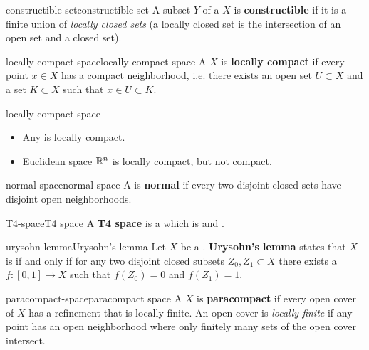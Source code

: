 \begin{topic}{constructible-set}{constructible set}
    A subset $Y$ of a  $X$ is \textbf{constructible} if it is a finite union of \textit{locally closed sets} (a locally closed set is the intersection of an open set and a closed set).
\end{topic}

\begin{topic}{locally-compact-space}{locally compact space}
    A  $X$ is \textbf{locally compact} if every point $x \in X$ has a compact neighborhood, i.e. there exists an open set $U \subset X$ and a  set $K \subset X$ such that $x \in U \subset K$.
\end{topic}

\begin{example}{locally-compact-space}
    \begin{itemize}
        \item Any  is locally compact.
        \item Euclidean space $\mathbb{R}^n$ is locally compact, but not compact.
    \end{itemize}
\end{example}

\begin{topic}{normal-space}{normal space}
    A  is \textbf{normal} if every two disjoint closed sets have disjoint open neighborhoods.
\end{topic}

\begin{topic}{T4-space}{T4 space}
    A \textbf{T4 space} is a  which is  and .
\end{topic}

\begin{topic}{urysohn-lemma}{Urysohn's lemma}
    Let $X$ be a . \textbf{Urysohn's lemma} states that $X$ is  if and only if for any two disjoint closed subsets $Z_0, Z_1 \subset X$ there exists a  $f : [0, 1] \to X$ such that $f(Z_0) = 0$ and $f(Z_1) = 1$.
\end{topic}

\begin{topic}{paracompact-space}{paracompact space}
    A  $X$ is \textbf{paracompact} if every open cover of $X$ has a refinement that is locally finite. An open cover is \textit{locally finite} if any point has an open neighborhood where only finitely many sets of the open cover intersect.
\end{topic}

